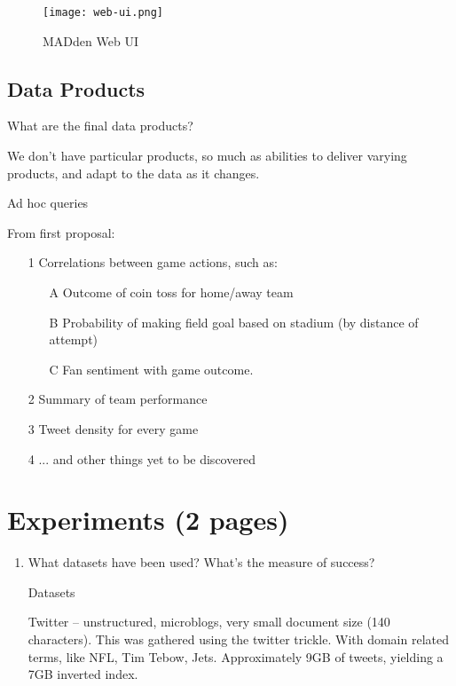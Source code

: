 \documentclass{article}
\newcommand{\system}{MADden\xspace}
\begin{document}
\begin{enumerate}
  \begin{figure}
    \begin{center}
      \texttt{[image: web-ui.png]}
      \caption{{\system} Web UI}
      \label{fig:web-ui}
    \end{center}
  \end{figure}




  \subsection{Data Products}
  What are the final data products?

  We don't have particular products, so much as abilities to deliver varying products, and adapt to the data as it changes.

  Ad hoc queries

  From first proposal:
  \begin{enumerate}
  \item[1] Correlations between game actions, such as:
    \begin{enumerate}
    \item[A] Outcome of coin toss for home/away team
    \item[B] Probability of making field goal based on
      stadium (by distance of attempt)
    \item[C] Fan sentiment with game outcome.
    \end{enumerate}
  \item[2] Summary of team performance
  \item[3] Tweet density for every game
  \item[4] ... and other things yet to be discovered
  \end{enumerate}




  \section{Experiments (2 pages)}
  \begin{enumerate}
  \item What datasets have been used? What’s the measure of success?

    Datasets

    Twitter -- unstructured, microblogs, very small document size (140 characters). This was gathered using the twitter trickle. With domain related terms, like NFL, Tim Tebow, Jets.
    Approximately 9GB of tweets, yielding a 7GB inverted index.


\end{enumerate}
\end{enumerate}
\end{document}
